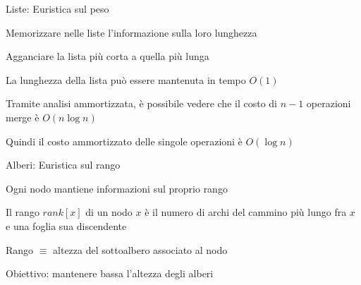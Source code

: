 \begin{frame}{Liste: Euristica sul peso}

\vspace{-9pt}
\begin{myboxtitle}
\BIL
\item Memorizzare nelle liste l’informazione sulla loro lunghezza
\item Agganciare la lista più corta a quella più lunga
\item La lunghezza della lista può essere mantenuta in tempo $O(1)$
\EIL 
\end{myboxtitle}

\begin{myboxtitle}[Complessità]
\BIL
\item Tramite analisi ammortizzata, è possibile vedere che il costo
di $n-1$ operazioni merge è $O(n \log n)$
\item Quindi il costo ammortizzato delle singole operazioni è $O(\log n)$
\EIL
\end{myboxtitle}
\end{frame}

\begin{frame}{Alberi: Euristica sul rango}

\vspace{-9pt}
\begin{myboxtitle}
\BIL
\item Ogni nodo mantiene informazioni sul proprio rango
\item Il rango $\mathit{rank}[x]$ di un nodo $x$ è il numero di archi 
del cammino più lungo fra $x$ e una foglia sua discendente
\item Rango $\equiv$ altezza del sottoalbero associato al nodo
\item Obiettivo: mantenere bassa l'altezza degli alberi
\EIL 
\end{myboxtitle}

\end{frame}

